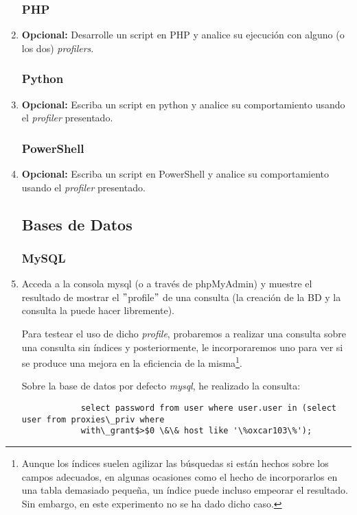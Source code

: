 \documentclass[paper=a4, fontsize=11pt]{scrartcl} %
\numberwithin{equation}{section} %
\numberwithin{figure}{section} %
\numberwithin{table}{section} %
\begin{document}
\begin{enumerate}
	\subsubsection{PHP}
		\item \textbf{Opcional:} Desarrolle un script en PHP y analice su ejecución con alguno (o
		los dos) \textit{profilers}.
		
	\subsubsection{Python}
		\item \textbf{Opcional:} Escriba un script en python y analice su comportamiento usando el
		\textit{profiler} presentado.
		
	\subsubsection{PowerShell}
		\item \textbf{Opcional:} Escriba un script en PowerShell y analice su comportamiento
		usando el \textit{profiler} presentado.
		
	\subsection{Bases de Datos}
	\subsubsection{MySQL}
		\item Acceda a la consola mysql (o a través de phpMyAdmin) y muestre el resultado de mostrar
		el $"$profile$"$ de una consulta (la creación de la BD y la consulta la puede hacer libremente).
		
		Para testear el uso de dicho \textit{profile}, probaremos a realizar una consulta sobre una
		consulta sin índices y posteriormente, le incorporaremos uno para ver si se produce una mejora
		en la eficiencia de la misma\footnote{Aunque los índices suelen agilizar las búsquedas si están
		hechos sobre los campos adecuados, en algunas ocasiones como el hecho de incorporarlos en una
		tabla demasiado pequeña, un índice puede incluso empeorar el resultado. Sin embargo, en este
		experimento no se ha dado dicho caso.}.
		
		Sobre la base de datos por defecto \textit{mysql}, he realizado la consulta:
		\begin{verbatim}
			select password from user where user.user in (select user from proxies\_priv where
			with\_grant$>$0 \&\& host like '\%oxcar103\%');
		\end{verbatim}
		

\end{enumerate}
\end{document}
